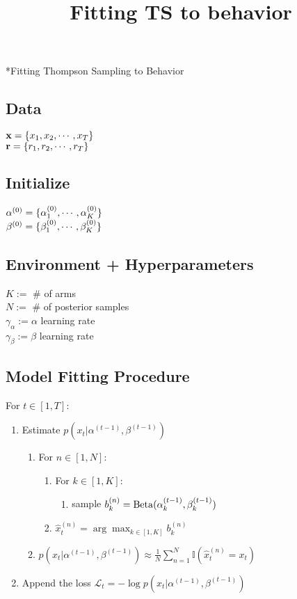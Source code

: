 \documentclass{article}
\title{Fitting TS to behavior}
\begin{document}
\begin{section}*{Fitting Thompson Sampling to Behavior}
\subsection*{Data}
${\bf x} = \{x_1, x_2, \cdots, x_T \}$ \\
${\bf r} = \{r_1, r_2, \cdots, r_T \}$ \\


\subsection*{Initialize}
${\bf \alpha}^{(0)} = \{\alpha^{(0)}_1, \cdots,  \alpha^{(0)}_K\}$ \\
${\bf \beta}^{(0)} = \{\beta^{(0)}_1, \cdots,  \beta^{(0)}_K\}$ \\

\subsection*{Environment + Hyperparameters}
$K :=$ \# of arms \\ 
$N :=$ \# of posterior samples \\ 
$\gamma_\alpha := \alpha$ learning rate \\
$\gamma_\beta := \beta$ learning rate \\

\subsection*{Model Fitting Procedure}
   \begin{tcolorbox}[title= Thompson Sampling]
\noindent For $t \in [1, T]$:
    \begin{enumerate}
        \item Estimate $p(x_t | \alpha^{(t - 1)}, \beta^{(t - 1)})$
        \begin{enumerate}
            \item For $n \in [1, N]$:
                \begin{enumerate}
                    \item For $k \in [1, K]$:
                    \begin{enumerate}
                        \item sample $b_k^{(n)} = {\rm Beta}(\alpha^{(t-1)}_k,\beta^{(t - 1)}_k)$ 
                    \end{enumerate}
                    \item $\hat{x}_t^{(n)} = \arg\max_{k \in [1, K]} b_k^{(n)}$
                \end{enumerate}
            \item $p(x_t | \alpha^{(t - 1)}, \beta^{(t - 1)}) \approx  \frac{1}{N}\sum_{n = 1}^N \mathbb{I}(\hat{x}_t^{(n)} = x_t)$
        \end{enumerate}
        \item Append the loss $\mathcal{L}_t = -\log p(x_t | \alpha^{(t - 1)}, \beta^{(t - 1)})$


\end{enumerate}
\end{tcolorbox}
\end{section}
\end{document}
